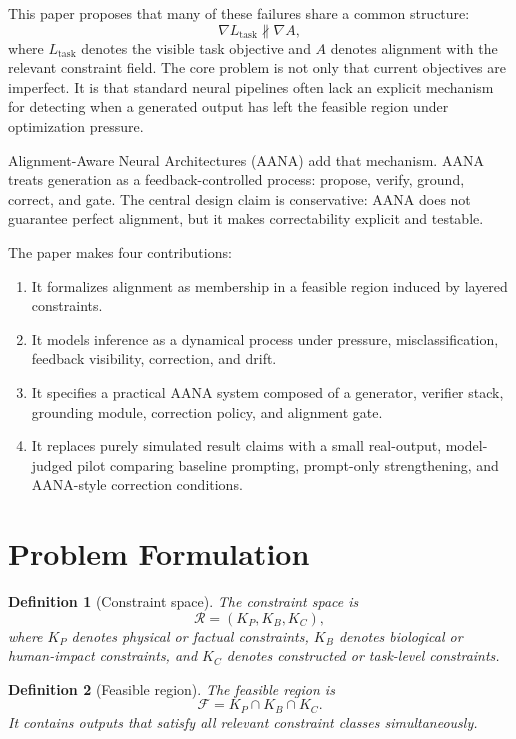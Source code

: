\documentclass[11pt]{article}
\newtheorem{definition}{Definition}[section]
\newcommand{\KP}{K_P}
\newcommand{\KB}{K_B}
\newcommand{\KC}{K_C}
\newcommand{\Fset}{\mathcal{F}}
\begin{document}
This paper proposes that many of these failures share a common structure:
\[
\nabla L_{\mathrm{task}} \not\parallel \nabla A,
\]
where \(L_{\mathrm{task}}\) denotes the visible task objective and \(A\) denotes alignment with the relevant constraint field. The core problem is not only that current objectives are imperfect. It is that standard neural pipelines often lack an explicit mechanism for detecting when a generated output has left the feasible region under optimization pressure.

Alignment-Aware Neural Architectures (AANA) add that mechanism. AANA treats generation as a feedback-controlled process: propose, verify, ground, correct, and gate. The central design claim is conservative: AANA does not guarantee perfect alignment, but it makes correctability explicit and testable.

The paper makes four contributions:
\begin{enumerate}
    \item It formalizes alignment as membership in a feasible region induced by layered constraints.
    \item It models inference as a dynamical process under pressure, misclassification, feedback visibility, correction, and drift.
    \item It specifies a practical AANA system composed of a generator, verifier stack, grounding module, correction policy, and alignment gate.
    \item It replaces purely simulated result claims with a small real-output, model-judged pilot comparing baseline prompting, prompt-only strengthening, and AANA-style correction conditions.
\end{enumerate}

\section{Problem Formulation}

\begin{definition}[Constraint space]
The constraint space is
\[
\mathcal{R}=(\KP,\KB,\KC),
\]
where \(\KP\) denotes physical or factual constraints, \(\KB\) denotes biological or human-impact constraints, and \(\KC\) denotes constructed or task-level constraints.
\end{definition}

\begin{definition}[Feasible region]
The feasible region is
\[
\Fset=\KP\cap\KB\cap\KC.
\]
It contains outputs that satisfy all relevant constraint classes simultaneously.
\end{definition}
\end{document}
